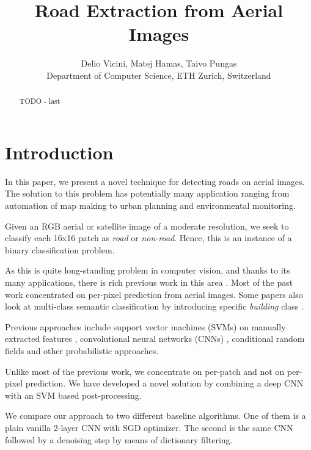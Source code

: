 \documentclass[10pt,conference,compsocconf]{IEEEtran}
\begin{document}
\title{Road Extraction from Aerial Images}
\author{
  Delio Vicini, Matej Hamas, Taivo Pungas\\
  Department of Computer Science, ETH Zurich, Switzerland
}

\maketitle

\begin{abstract}
  TODO - last
\end{abstract}

\section{Introduction}
\label{sec:intro}

In this paper, we present a novel technique for detecting roads on aerial images. The solution to this problem has potentially many application ranging from automation of map making to urban planning and environmental monitoring.

Given an RGB aerial or satellite image of a moderate resolution, we seek to classify each 16x16 patch as \textit{road} or \textit{non-road}. Hence, this is an instance of a binary classification problem.

As this is quite long-standing problem in computer vision, and thanks to its many applications, there is rich previous work in this area \cite{Huang.2002} \cite{MnihThesis.2013} \cite{Long.2014} \cite{Montoya.2015} \cite{Saito.2015}. Most of the past work concentrated on per-pixel prediction from aerial images. Some papers also look at multi-class semantic classification by introducing specific \textit{building} class \cite{Saito.2015}. 

Previous approaches include support vector machines (SVMs) on manually extracted features \cite{Huang.2002}, convolutional neural networks (CNNs) \cite{Long.2014} \cite{Saito.2015}, conditional random fields \cite{Montoya.2015} and other probabilistic approaches.

Unlike most of the previous work, we concentrate on per-patch and not on per-pixel prediction. We have developed a novel solution by combining a deep CNN with an SVM based post-processing.

We compare our approach to two different baseline algorithms. One of them is a plain vanilla 2-layer CNN with SGD optimizer. The second is the same CNN followed by a denoising step by means of dictionary filtering.
\end{document}
